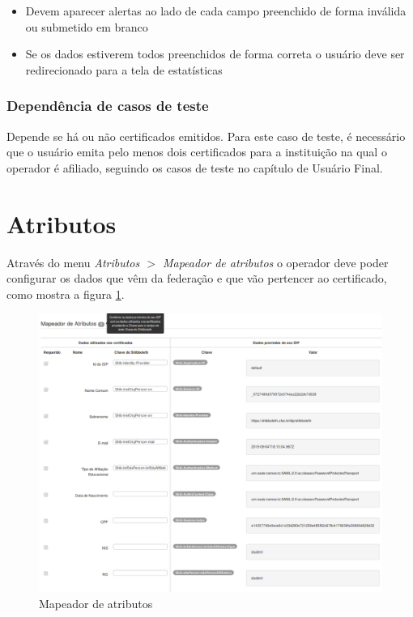 \begin{itemize}

	\item Devem aparecer alertas ao lado de cada campo preenchido de forma inválida ou submetido em branco
	\item Se os dados estiverem todos preenchidos de forma correta o usuário deve ser redirecionado para a tela de estatísticas
	
\end{itemize}

\subsubsection{Dependência de casos de teste}
Depende se há ou não certificados emitidos. Para este caso de teste, é necessário que o usuário emita pelo menos dois certificados para a instituição na qual o operador é afiliado, seguindo os casos de teste no capítulo de Usuário Final.

\section{Atributos}

Através do menu \textit{Atributos $>$ Mapeador de atributos} o operador deve poder configurar os dados que vêm da federação e que vão pertencer ao certificado, como mostra a figura \ref{fig:atmapop}.

\begin{figure}[ht]
     \centering
     \includegraphics[scale=0.4]{images/oper_attributesmapper.png}
     \caption{Mapeador de atributos}
     \label{fig:atmapop}
\end{figure}

